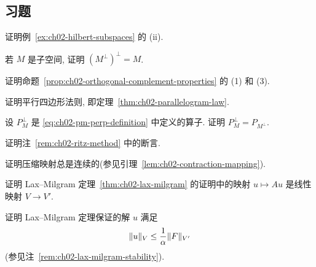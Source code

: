 \subsection*{习题}
\label{sec:ch02-exercises}
\setcounter{exerciseitem}{0}

\begin{MBExercise}
\label{ex:ch02-exercise-01}
证明例~\ref{ex:ch02-hilbert-subspaces} 的 (ii).
\end{MBExercise}

\begin{MBExercise}
\label{ex:ch02-exercise-02}
若 $M$ 是子空间, 证明 $(M^\perp)^\perp=M$.
\end{MBExercise}

\begin{MBExercise}
\label{ex:ch02-exercise-03}
证明命题~\ref{prop:ch02-orthogonal-complement-properties} 的 (1) 和 (3).
\end{MBExercise}

\begin{MBExercise}
\label{ex:ch02-exercise-04}
证明平行四边形法则, 即定理~\ref{thm:ch02-parallelogram-law}.
\end{MBExercise}

\begin{MBExercise}
\label{ex:ch02-exercise-05}
设 $P_M^\perp$ 是 \eqref{eq:ch02-pm-perp-definition} 中定义的算子. 证明 $P_M^\perp=P_{M^\perp}$.
\end{MBExercise}

\begin{MBExercise}
\label{ex:ch02-exercise-06}
证明注~\ref{rem:ch02-ritz-method} 中的断言.
\end{MBExercise}

\begin{MBExercise}
\label{ex:ch02-exercise-07}
证明压缩映射总是连续的(参见引理~\ref{lem:ch02-contraction-mapping}).
\end{MBExercise}

\begin{MBExercise}
\label{ex:ch02-exercise-08}
证明 Lax--Milgram 定理~\ref{thm:ch02-lax-milgram} 的证明中的映射 $u\mapsto Au$ 是线性映射 $V\longrightarrow V'$.
\end{MBExercise}

\begin{MBExercise}
\label{ex:ch02-exercise-09}
证明 Lax--Milgram 定理保证的解 $u$ 满足
\[
\MathBookFormulaID{formula-ch02-exercise-09-stability}
\|u\|_V\leq\frac1\alpha\|F\|_{V'}
\]
(参见注~\ref{rem:ch02-lax-milgram-stability}).
\end{MBExercise}

